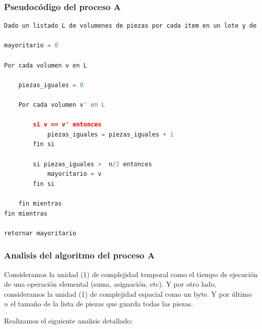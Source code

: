 \documentclass{article}
\begin{document}
\newpage
\subsubsection{Pseudocódigo del proceso A}

\begin{lstlisting}[language=Python, caption=Algoritmo del proceso A]
Dado un listado L de volumenes de piezas por cada item en un lote y de n elementos.

mayoritario = 0

Por cada volumen v en L
    
    piezas_iguales = 0

    Por cada volumen v' en L

        si v == v' entonces 
            piezas_iguales = piezas_iguales + 1
        fin si

        si piezas_iguales >  n/2 entonces
            mayoritario = v
        fin si

    fin mientras
fin mientras

retornar mayoritario

\end{lstlisting}

\subsubsection{Analisis del algoritmo del proceso A}

Consideramos la unidad (1) de complejidad temporal como el tiempo de ejecución de una operación elemental (suma, asignación, etc). 
Y por otro lado, consideramos la unidad (1) de complejidad espacial como un byte. Y por último \(n\) el tamaño de la lista de piezas que guarda todas las piezas.

Realizamos el siguiente analisis detallado:
\end{document}
